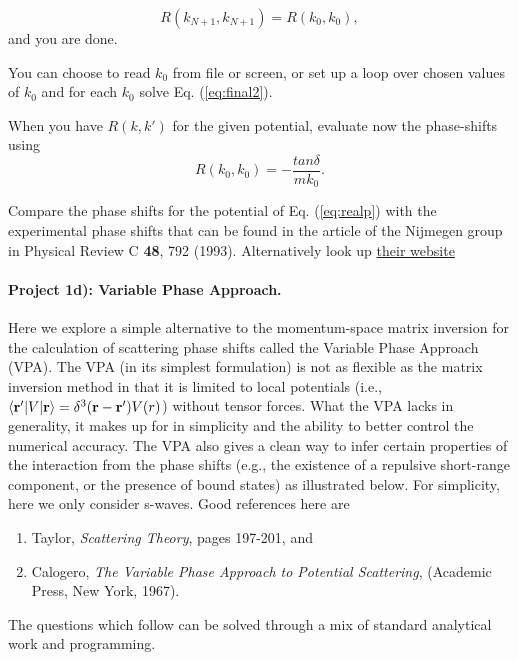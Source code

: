 \documentclass[%
oneside,                 %
final,                   %
10pt]{article}
\begin{document}
\begin{equation}
      R(k_{N+1},k_{N+1})=R(k_0,k_0),
\end{equation}
and you are done.

You can choose to read $k_0$ from file or screen, or set up
a loop over chosen values of $k_0$ and for each
$k_0$ solve Eq. (\ref{eq:final2}). 




When you have $R(k,k')$ for the given potential, evaluate now the phase-shifts  using
\begin{equation*}
R(k_0,k_0)=-\frac{tan\delta}{mk_0}.
\end{equation*}

Compare the phase shifts for the potential of Eq. (\ref{eq:realp}) with the  experimental phase shifts that can be found  in the article  of the Nijmegen group in Physical Review C \textbf{48}, 792 (1993).  Alternatively look up \href{{http://nn-online.org/}}{their website}


\paragraph{Project 1d): Variable Phase Approach.}
Here we explore a simple alternative to the momentum-space matrix inversion for the
calculation of scattering phase shifts called the Variable Phase Approach (VPA). The VPA (in 
its simplest formulation) is not as flexible as the matrix inversion method in that it is limited
to local potentials (i.e., $\langle{\bf r'}|V|{\bf r}\rangle = \delta^3({\bf r}-{\bf r'})V(r)$) 
without tensor forces. What the VPA lacks in
generality, it makes up for in simplicity and the ability to better control the numerical accuracy. The VPA also gives a clean way to infer certain properties of the interaction from the phase shifts (e.g., the existence of a repulsive short-range component, or the presence of bound states) as illustrated below.
For simplicity, here we only consider s-waves. Good references here are
\begin{enumerate}
\item Taylor, \emph{Scattering Theory}, pages 197-201, and

\item Calogero, \emph{The Variable Phase Approach to Potential Scattering}, (Academic Press, New York, 1967).  
\end{enumerate}

\noindent
The questions which follow can be solved through a mix of standard analytical work and programming.
\end{document}
